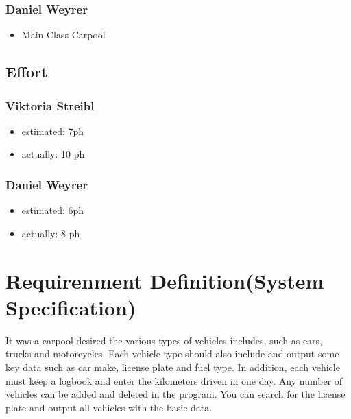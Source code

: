 \subsubsection{Daniel Weyrer}
\begin{itemize}
	\item Main Class Carpool
\end{itemize}

\subsection{Effort}

\subsubsection {Viktoria Streibl}
\begin{itemize}
	\item estimated: 7ph 
	\item actually: 10 ph
\end{itemize}

\subsubsection {Daniel Weyrer}
\begin{itemize}
	\item estimated: 6ph 
	\item actually: 8 ph
\end{itemize}


\section{Requirenment Definition(System Specification)}


It was a carpool desired the various types of vehicles includes, such as cars, trucks and motorcycles. Each vehicle type should also include and output some key data such as car make, license plate and fuel type. In addition, each vehicle must keep a logbook and enter the kilometers driven in one day.
Any number of vehicles can be added and deleted in the program. You can search for the license plate and output all vehicles with the basic data.

